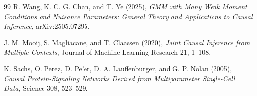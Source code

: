 \documentclass{article}
\begin{document}
\begin{thebibliography}{99}
   R. Wang, K. C. G. Chan, and T. Ye (2025), \emph{GMM with Many Weak Moment Conditions and Nuisance Parameters: General Theory and Applications to Causal Inference}, arXiv:2505.07295.

   J. M. Mooij, S. Magliacane, and T. Claassen (2020), \emph{Joint Causal Inference from Multiple Contexts}, Journal of Machine Learning Research 21, 1--108.

   K. Sachs, O. Perez, D. Pe'er, D. A. Lauffenburger, and G. P. Nolan (2005), \emph{Causal Protein-Signaling Networks Derived from Multiparameter Single-Cell Data}, Science 308, 523--529.

\end{thebibliography}
\end{document}

